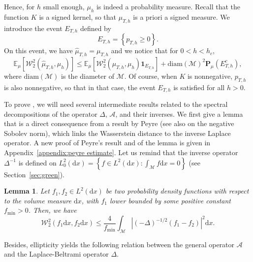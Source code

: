 \documentclass[10pt,a4paper]{article}
\newcommand{\E}{{\mathbb E}}
\renewcommand{\P}{{\mathbf P}}
\newcommand{\ind}{{\mathbf 1}}
\newcommand\cA{\mathcal{A}}
\newcommand\cM{\mathcal{M}}
\newcommand\W{\mathcal{W}}
\newcommand\dd{\mathrm{d}}
\newcommand{\ABS}[1]{{{\left| #1 \right|}}} %
\newcommand{\BRA}[1]{{{\left\{#1\right\}}}} %
\newcommand{\PAR}[1]{{{\left(#1\right)}}} %
\newcommand{\SBRA}[1]{{{\left[#1\right]}}} %
\newtheorem{lemma}[theorem]{Lemma}
\begin{document}
Hence, for $h$ small enough, $\mu_h$ is indeed a probability measure. Recall that 
the function $K$ is a signed kernel, so that $\mu_{T,h}$ is a priori a signed measure. We introduce the event $E_{T,h}$ defined by
\begin{equation}\label{eq:event}
	E_{T,h}=\BRA{ p_{T,h}\ge 0 }.
\end{equation}
On this event, we have $\widehat{\mu}_{T,h}=\mu_{T,h}$ and we notice that for $0<h<h_c$,
\begin{equation}\label{eq:E+E^c}
\E_\mu\SBRA{\W_2^2\PAR{\widehat{\mu}_{T,h},\mu_h}}\le \E_\mu\SBRA{\W_2^2\PAR{\mu_{T,h},\mu_h}\ind_{E_{T,h}}}+\mathrm{diam(\cM)}^2\P_\mu(E_{T,h}^c),
\end{equation}
where $\mathrm{diam}(\cM)$ is the diameter of $\cM$. Of course, when $K$ is nonnegative, $p_{T,h}$ is also nonnegative, so that in that case, the event $E_{T,h}$ is  satisfied for all $h>0$.


To prove , we will need several intermediate results  related to the spectral decompositions of the operator $\Delta$, $\cA$, and their inverses. 
We first give a lemma that is a direct consequence from a result by Peyre \cite[Corollary 2.3]{peyre2018comparison} (see also \cite[Section 5.5.2]{santambrogio2015} on the negative Sobolev norm), which links the Wasserstein distance to the inverse Laplace operator. {A new proof of Peyre's result and of the lemma is given in Appendix~\ref{appendix:peyre estimate}.} Let us remind that the inverse operator $\Delta^{-1}$ is defined on $L^2_0(\dd x)=\BRA{f\in L^2(\dd x): \int_\cM f\dd x=0}$ (see Section~\ref{sec:green}).

\begin{lemma}\label{lem:wang}
	Let $f_1,f_2\in L^2(\dd x)$ be two probability density functions with respect to the volume measure $\dd x$, with $f_1$ lower bounded by some positive constant $f_{\min}>0$. Then, we have
	\begin{equation}
		\W_2^2(f_1 \dd x,f_2 \dd x)\le \frac{4}{f_{\min}}\int_{\cM}\ABS{ \PAR{-\Delta}^{-1/2}\PAR{f_1-f_2}}^2\dd x.
	\end{equation}
\end{lemma}


Besides, ellipticity yields the following relation between the general operator $\cA$ and the Laplace-Beltrami operator $\Delta$.
\end{document}
